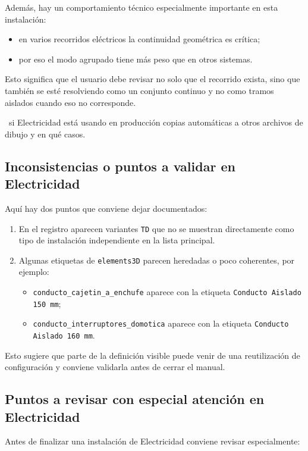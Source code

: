 Además, hay un comportamiento técnico especialmente importante en esta instalación:

\begin{itemize}
\item en varios recorridos eléctricos la continuidad geométrica es crítica;
\item por eso el modo agrupado tiene más peso que en otros sistemas.
\end{itemize}

Esto significa que el usuario debe revisar no solo que el recorrido exista, sino que también se esté resolviendo como un conjunto continuo y no como tramos aislados cuando eso no corresponde.

\pendingtag\ si Electricidad está usando en producción copias automáticas a otros archivos de dibujo y en qué casos.

\subsection{Inconsistencias o puntos a validar en Electricidad}

Aquí hay dos puntos que conviene dejar documentados:

\begin{enumerate}
\item En el registro aparecen variantes \texttt{TD} que no se muestran directamente como tipo de instalación independiente en la lista principal.
\item Algunas etiquetas de \texttt{elements3D} parecen heredadas o poco coherentes, por ejemplo:
\begin{itemize}
\item \texttt{conducto\_cajetin\_a\_enchufe} aparece con la etiqueta \texttt{Conducto Aislado 150 mm};
\item \texttt{conducto\_interruptores\_domotica} aparece con la etiqueta \texttt{Conducto Aislado 160 mm}.
\end{itemize}
\end{enumerate}

Esto sugiere que parte de la definición visible puede venir de una reutilización de configuración y conviene validarla antes de cerrar el manual.

\subsection{Puntos a revisar con especial atención en Electricidad}

Antes de finalizar una instalación de Electricidad conviene revisar especialmente:

